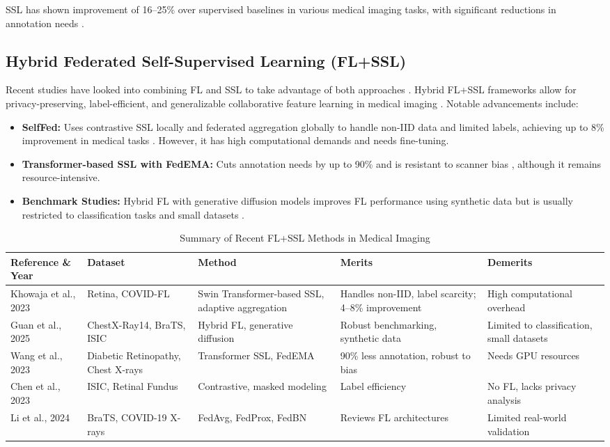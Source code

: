 \documentclass[a4paper, 10 pt, conference]{ieeeconf}
\begin{document}
SSL has shown improvement of 16–25\% over supervised baselines in various medical imaging tasks, with significant reductions in annotation needs \cite{Sowrirajan2021}.

\subsection{Hybrid Federated Self-Supervised Learning (FL+SSL)}

Recent studies have looked into combining FL and SSL to take advantage of both approaches \cite{Zhuang2021}. Hybrid FL+SSL frameworks allow for privacy-preserving, label-efficient, and generalizable collaborative feature learning in medical imaging \cite{Rieke2020}. Notable advancements include:

\begin{itemize}
    \item \textbf{SelfFed:} Uses contrastive SSL locally and federated aggregation globally to handle non-IID data and limited labels, achieving up to 8\% improvement in medical tasks \cite{Zhuang2021}. However, it has high computational demands and needs fine-tuning.
    \item \textbf{Transformer-based SSL with FedEMA:} Cuts annotation needs by up to 90\% and is resistant to scanner bias \cite{Wang2023}, although it remains resource-intensive.
    \item \textbf{Benchmark Studies:} Hybrid FL with generative diffusion models improves FL performance using synthetic data but is usually restricted to classification tasks and small datasets \cite{Guan2025}.
\end{itemize}

\begin{table*}[!htbp]
\centering
\caption{Summary of Recent FL+SSL Methods in Medical Imaging}
\label{tab:fl_ssl_summary}
\small
\begin{tabularx}{\textwidth}{|p{2.5cm}|p{2.8cm}|p{3cm}|p{3.2cm}|p{2.8cm}|}
\hline
\textbf{Reference \& Year} & \textbf{Dataset} & \textbf{Method} & \textbf{Merits} & \textbf{Demerits} \\
\hline
Khowaja et al., 2023 & Retina, COVID-FL & Swin Transformer-based SSL, adaptive aggregation & Handles non-IID, label scarcity; 4–8\% improvement & High computational overhead \\
\hline
Guan et al., 2025 & ChestX-Ray14, BraTS, ISIC & Hybrid FL, generative diffusion & Robust benchmarking, synthetic data & Limited to classification, small datasets \\
\hline
Wang et al., 2023 & Diabetic Retinopathy, Chest X-rays & Transformer SSL, FedEMA & 90\% less annotation, robust to bias & Needs GPU resources \\
\hline
Chen et al., 2023 & ISIC, Retinal Fundus & Contrastive, masked modeling & Label efficiency & No FL, lacks privacy analysis \\
\hline
Li et al., 2024 & BraTS, COVID-19 X-rays & FedAvg, FedProx, FedBN & Reviews FL architectures & Limited real-world validation \\
\hline
\end{tabularx}
\end{table*}
\end{document}
